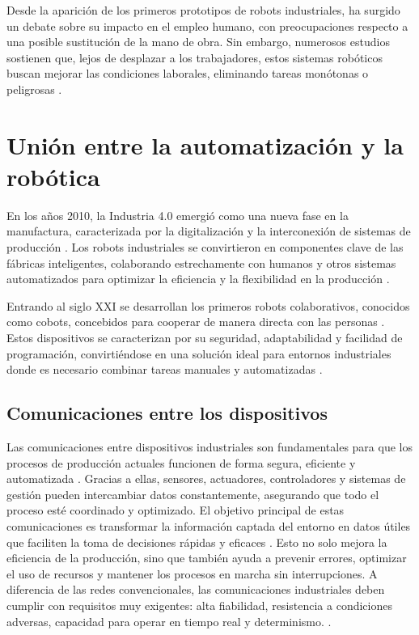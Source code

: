 Desde la aparición de los primeros prototipos de robots industriales, ha surgido un debate sobre su impacto en el empleo humano, con preocupaciones respecto a una posible sustitución de la mano de obra. Sin embargo, numerosos estudios sostienen que, lejos de desplazar a los trabajadores, estos sistemas robóticos buscan mejorar las condiciones laborales, eliminando tareas monótonas o peligrosas \cite{info_robotica_industrial_2}. 

\section{Unión entre la automatización y la robótica}
\label{sec:terceraseccion}

En los años 2010, la Industria 4.0 emergió como una nueva fase en la manufactura, caracterizada por la digitalización y la interconexión de sistemas de producción  \cite{intro_union}.  Los robots industriales se convirtieron en componentes clave de las fábricas inteligentes, colaborando estrechamente con humanos y otros sistemas automatizados para optimizar la eficiencia y la flexibilidad en la producción \cite{intro_union}. 

Entrando al siglo XXI se desarrollan los primeros robots colaborativos, conocidos como cobots, concebidos para cooperar de manera directa con las personas  \cite{intro_union}. Estos dispositivos se caracterizan por su seguridad, adaptabilidad y facilidad de programación, convirtiéndose en una solución ideal para entornos industriales donde es necesario combinar tareas manuales y automatizadas  \cite{intro_union}. 

\subsection{Comunicaciones entre los dispositivos}

Las comunicaciones entre dispositivos industriales son fundamentales para que los procesos de producción actuales funcionen de forma segura, eficiente y automatizada \cite{intro_com}. Gracias a ellas, sensores, actuadores, controladores y sistemas de gestión pueden intercambiar datos constantemente, asegurando que todo el proceso esté coordinado y optimizado. El objetivo principal de estas comunicaciones es transformar la información captada del entorno en datos útiles que faciliten la toma de decisiones rápidas y eficaces \cite{intro_com}. Esto no solo mejora la eficiencia de la producción, sino que también ayuda a prevenir errores, optimizar el uso de recursos y mantener los procesos en marcha sin interrupciones. A diferencia de las redes convencionales, las comunicaciones industriales deben cumplir con requisitos muy exigentes: alta fiabilidad, resistencia a condiciones adversas, capacidad para operar en tiempo real y determinismo. \cite{intro_com}. 


